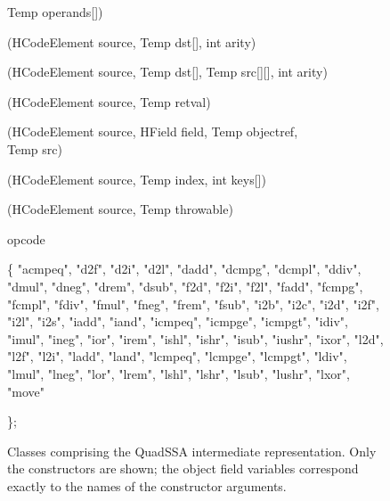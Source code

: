 \documentclass[11pt,notitlepage,twocolumn,twoside]{article}
\begin{document}
\begin{figure*}
{\begin{description}
                  Temp operands[])
\item[\cls{PHI}](HCodeElement source, Temp dst[], int arity)
\item[\cls{PHI}](HCodeElement source, Temp dst[], Temp src[][], int arity)
\item[\cls{RETURN}](HCodeElement source, Temp retval) 
\item[\cls{SET}](HCodeElement source, HField field, Temp objectref, \\ 
                 Temp src) 
\item[\cls{SWITCH}](HCodeElement source, Temp index, int keys[])
\item[\cls{THROW}](HCodeElement source, Temp throwable)
\item[]
\item[]  opcode  
\item[] \{  "acmpeq", "d2f", "d2i", "d2l", "dadd", "dcmpg",
"dcmpl", "ddiv", "dmul", "dneg", "drem", "dsub", "f2d", "f2i", "f2l",
"fadd", "fcmpg", "fcmpl", "fdiv", "fmul", "fneg", "frem", "fsub",
"i2b", "i2c", "i2d", "i2f", "i2l", "i2s", "iadd", "iand", "icmpeq",
"icmpge", "icmpgt", "idiv", "imul", "ineg", "ior", "irem", "ishl",
"ishr", "isub", "iushr", "ixor", "l2d", "l2f", "l2i", "ladd", "land",
"lcmpeq", "lcmpge", "lcmpgt", "ldiv", "lmul", "lneg", "lor", "lrem",
"lshl", "lshr", "lsub", "lushr", "lxor", "move"
\item[] \};
\end{description}
}

\caption{Classes comprising the QuadSSA intermediate representation.
Only the constructors are shown; the object field variables correspond
exactly to the names of the constructor arguments.}
\label{fig:classes}
\end{figure*}


\end{document}
